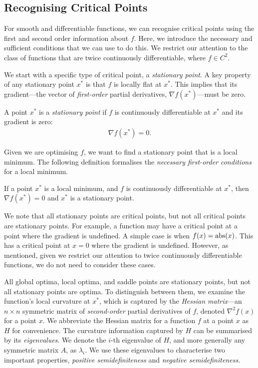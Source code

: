 \subsection{Recognising Critical Points}
\label{ssec:recognising_critical_points}

For smooth and differentiable functions, we can recognise critical points using the first and second order information about $f$. Here, we introduce the necessary and sufficient conditions that we can use to do this. We restrict our attention to the class of functions that are twice continuously differentiable, where $f \in C^2$.

We start with a specific type of critical point, a \textit{stationary point}. A key property of any stationary point $x^*$ is that $f$ is locally flat at $x^*$. This implies that its gradient---the vector of \textit{first-order} partial derivatives, $\nabla f(x^*)$---must be zero.
\begin{definition}
    A point $x^*$ is a \textit{stationary point} if $f$ is continuously differentiable at $x^*$ and its gradient is zero:
    \begin{align}
        \nabla f(x^*) = 0.
    \end{align}
\end{definition}

Given we are optimising $f$, we want to find a stationary point that is a local minimum. The following definition formalises the \textit{necessary first-order conditions} for a local minimum.
\begin{definition}
    If a point $x^*$ is a local minimum, and $f$ is continuously differentiable at $x^*$, then $\nabla f(x^*) = 0$ and $x^*$ is a stationary point.
\end{definition}

We note that all stationary points are critical points, but not all critical points are stationary points. For example, a function may have a critical point at a point where the gradient is undefined. A simple case is when $f(x) = \operatorname{abs}({x})$. This has a critical point at $x = 0$ where the gradient is undefined. However, as mentioned, given we restrict our attention to twice continuously differentiable functions, we do not need to consider these cases. 

All global optima, local optima, and saddle points are stationary points, but not all stationary points are optima. To distinguish between them, we examine the function's local curvature at $x^*$, which is captured by the \textit{Hessian matrix}---an $n \times n$ symmetric matrix of \textit{second-order} partial derivatives of $f$, denoted $\nabla^2 f(x)$ for a point $x$. We abbreviate the Hessian matrix for a function $f$ at a point $x$ as $H$ for convenience. The curvature information captured by $H$ can be summarised by its \textit{eigenvalues}. We denote the $i$-th eigenvalue of $H$, and more generally any symmetric matrix $A$, as $\lambda_i$. We use these eigenvalues to characterise two important properties, \textit{positive semidefiniteness} and \textit{negative semidefiniteness}.

